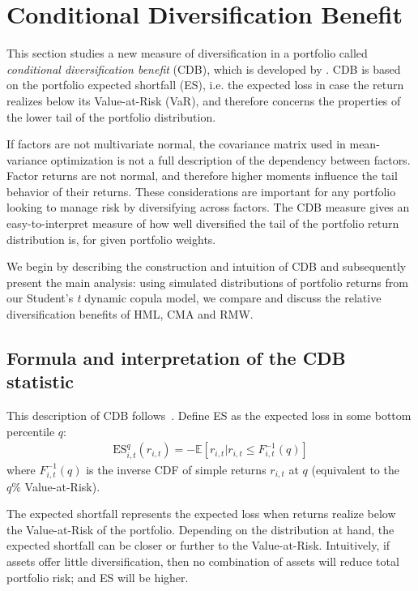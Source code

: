 
\section{Conditional Diversification Benefit} %
\label{sec:conditional_diversification_benefit}

This section studies a new measure of diversification in a portfolio called \emph{conditional diversification benefit} (CDB), which is developed by \textcite{ChristoffersenErrunzaJacobLanglois2012}. CDB is based on the portfolio expected shortfall (ES), i.e. the expected loss in case the return realizes below its Value-at-Risk (VaR), and therefore concerns the properties of the lower tail of the portfolio distribution.

If factors are not multivariate normal, the covariance matrix used in mean-variance optimization is not a full description of the dependency between factors. Factor returns are not normal, and therefore higher moments influence the tail behavior of their returns. These considerations are important for any portfolio looking to manage risk by diversifying across factors. The CDB measure gives an easy-to-interpret measure of how well diversified the tail of the portfolio return distribution is, for given portfolio weights.

We begin by describing the construction and intuition of CDB and subsequently present the main analysis: using simulated distributions of portfolio returns from our Student's \textit{t} dynamic copula model, we compare and discuss the relative diversification benefits of HML, CMA and RMW.

\subsection{Formula and interpretation of the CDB statistic}

This description of CDB follows~\textcite{ChristoffersenErrunzaJacobLanglois2012}. Define ES as the expected loss in some bottom percentile $q$:
\begin{align}
    \text{ES}_{i,t}^q(r_{i,t}) = -\mathbb{E}[r_{i,t} | r_{i,t} \leq F_{i,t}^{-1}(q)]
\end{align}
where $F_{i,t}^{-1}(q)$ is the inverse CDF of simple returns $r_{i,t}$ at $q$ (equivalent to the $q\%$ Value-at-Risk). 

The expected shortfall represents the expected loss when returns realize below the Value-at-Risk of the portfolio. Depending on the distribution at hand, the expected shortfall can be closer or further to the Value-at-Risk. Intuitively, if assets offer little diversification, then no combination of assets will reduce total portfolio risk; and ES will be higher. 

